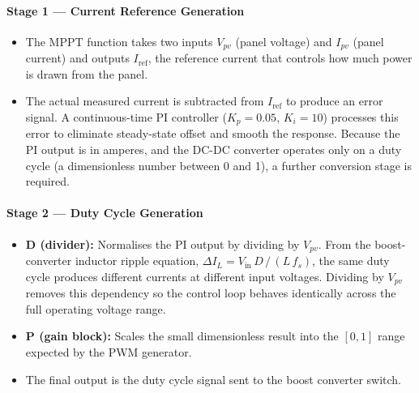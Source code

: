\paragraph{Stage 1 — Current Reference Generation}
\begin{itemize}
  \item The MPPT function takes two inputs $V_{pv}$ (panel voltage) and $I_{pv}$ (panel
        current) and outputs $I_{\text{ref}}$, the reference current that controls how
        much power is drawn from the panel.
  \item The actual measured current is subtracted from $I_{\text{ref}}$ to produce an
        error signal. A continuous-time PI controller ($K_p = 0.05$, $K_i = 10$)
        processes this error to eliminate steady-state offset and smooth the response.
        Because the PI output is in amperes, and the DC-DC converter operates only on a
        duty cycle (a dimensionless number between 0 and 1), a further conversion stage
        is required.
\end{itemize}

\paragraph{Stage 2 — Duty Cycle Generation}
\begin{itemize}
  \item \textbf{D (divider):} Normalises the PI output by dividing by $V_{pv}$. From
        the boost-converter inductor ripple equation,
        $\Delta I_L = V_{\text{in}}\,D\,/\,(L\,f_s)$, the same duty cycle produces
        different currents at different input voltages. Dividing by $V_{pv}$ removes
        this dependency so the control loop behaves identically across the full
        operating voltage range.
  \item \textbf{P (gain block):} Scales the small dimensionless result into the $[0,1]$
        range expected by the PWM generator.
  \item The final output is the duty cycle signal sent to the boost converter switch.
\end{itemize}
\newpage
